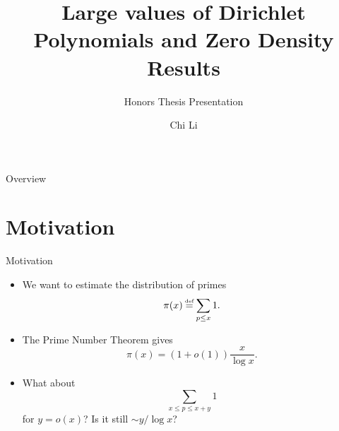 \documentclass[aspectratio=169,xcolor=dvipsnames]{beamer}
\title{Large values of Dirichlet Polynomials and Zero Density Results}
\subtitle{Honors Thesis Presentation}
\author{Chi Li}
\newcommand\defeq{\mathrel{\stackrel{\makebox[0pt]{\mbox{\normalfont\tiny def}}}{=}}}
\begin{document}
\begin{frame}
    \titlepage
\end{frame}
\begin{frame}{Overview}
    \tableofcontents
\end{frame}
\section{Motivation
}
\begin{frame}{Motivation}
    \begin{itemize}
        \item We want to estimate the distribution of primes  \[
        \pi(x)\defeq \sum_{p\leq x} 1.
        \]
        \item The Prime Number Theorem gives \[
        \pi(x) = (1+o(1))\frac{x}{\log x}.
        \]
        \item What about \[
        \sum_{x\leq p\leq x+y} 1
        \]
        for $y=o(x)$? Is it still $\sim y/\log x$?
    \end{itemize}
    
\end{frame}
\end{document}
